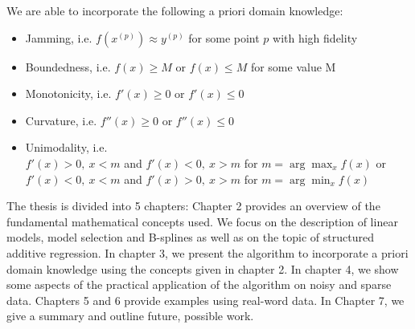 We are able to incorporate the following a priori domain knowledge: 

\begin{itemize} \label{list:possible-constraints}
	\item Jamming, i.e. $f(x^{(p)}) \approx y^{(p)}$ for some point $p$ with high fidelity
	\item Boundedness, i.e. $f(x) \ge M$ or $f(x) \le M$ for some value M
	\item Monotonicity, i.e. $f'(x) \ge 0$ or $f'(x) \le 0$
	\item Curvature, i.e. $f''(x) \ge 0$ or $f''(x) \le 0$
	\item Unimodality, i.e. \\ $f'(x) > 0, \ x < m$ and $f'(x) < 0, \ x > m$ for $m = \arg \max_{x} f(x)$ or \\ $f'(x) < 0, \ x < m$ and $f'(x) > 0, \ x > m$ for $m = \arg \min_{x} f(x)$
\end{itemize}
%
The thesis is divided into 5 chapters: Chapter 2 provides an overview of the fundamental mathematical concepts used. We focus on the description of linear models, model selection and B-splines as well as on the topic of structured additive regression. In chapter 3, we present the algorithm to incorporate a priori domain knowledge using the concepts given in chapter 2. In chapter 4, we show some aspects of the practical application of the algorithm on noisy and sparse data. Chapters 5 and 6 provide examples using real-word data. In Chapter 7, we give a summary and outline future, possible work. 

